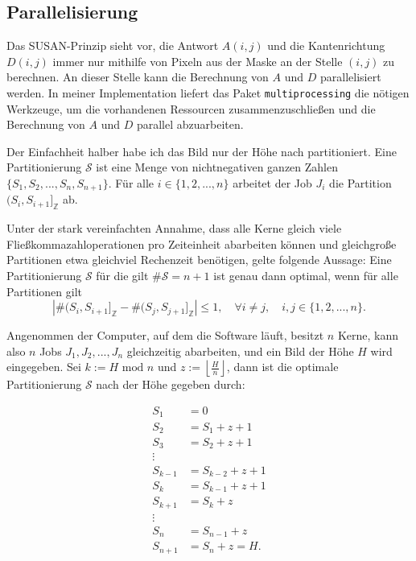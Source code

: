 \documentclass[a4paper, 11pt]{report}
\theoremstyle{definition}
\begin{document}
			\subsection{Parallelisierung}
				Das SUSAN-Prinzip sieht vor, die Antwort $A(i,j)$ und die Kantenrichtung $D(i,j)$ immer nur mithilfe von Pixeln aus der Maske an der Stelle $(i,j)$ zu berechnen. An dieser Stelle kann die Berechnung von $A$ und $D$ parallelisiert werden. In meiner Implementation liefert das Paket \texttt{multiprocessing} die nötigen Werkzeuge, um die vorhandenen Ressourcen zusammenzuschließen und die Berechnung von $A$ und $D$ parallel abzuarbeiten.

				Der Einfachheit halber habe ich das Bild nur der Höhe nach partitioniert. Eine Partitionierung $\mathcal{S}$ ist eine Menge von nichtnegativen ganzen Zahlen $\{S_1, S_2, ..., S_n, S_{n+1}\}$. Für alle $i \in \{1,2,...,n\}$ arbeitet der Job $J_i$ die Partition $(S_i, S_{i+1}]_\mathbb{Z}$ ab.

				Unter der stark vereinfachten Annahme, dass alle Kerne gleich viele Fließkommazahloperationen pro Zeiteinheit abarbeiten können und gleichgroße Partitionen etwa gleichviel Rechenzeit benötigen, gelte folgende Aussage: Eine Partitionierung $\mathcal{S}$ für die gilt $\#\mathcal{S} = n+1$ ist genau dann optimal, wenn für alle Partitionen gilt
				$$|\#(S_i, S_{i+1}]_\mathbb{Z} - \#(S_j, S_{j+1}]_\mathbb{Z}| \leq 1, \quad \forall i \neq j, \quad i,j \in \{1,2,...,n\}.$$

				Angenommen der Computer, auf dem die Software läuft, besitzt $n$ Kerne, kann also $n$ Jobs $J_1,J_2,...,J_n$ gleichzeitig abarbeiten, und ein Bild der Höhe $H$ wird eingegeben. Sei $k := H \text{ mod } n$ und $z := \left\lfloor \frac{H}{n} \right\rfloor$, dann ist die optimale Partitionierung $\mathcal{S}$ nach der Höhe gegeben durch:

				\begin{align*}
				S_1 	&= 					0		\\
				S_2 	&= S_1		+	z + 1		\\
				S_3 	&= S_2 		+ 	z + 1		\\
									\vdots			\\
				S_{k-1} &= S_{k-2}	+ 	z + 1		\\
				S_{k}	&= S_{k-1} 	+ 	z + 1		\\
				S_{k+1} &= S_k 		+ 	z			\\
									\vdots			\\
				S_{n} 	&= S_{n-1} 	+ 	z 			\\
				S_{n+1} &= S_{n}	+	z  = H.	\\
				\end{align*}
\end{document}
